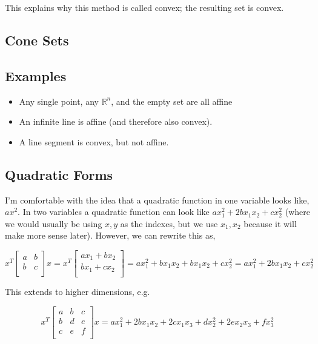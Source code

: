 \documentclass{article}
\begin{document}
This explains why this method is called convex; the resulting set is convex.

\subsection{Cone Sets}

\subsection{Examples}

\begin{itemize}
    \item Any single point, any $\mathbb{R}^n$, and the empty set are all affine
    \item An infinite line is affine (and therefore also convex).
    \item A line segment is convex, but not affine.
\end{itemize}

\subsection{Quadratic Forms}

I'm comfortable with the idea that a quadratic function in one variable looks like, $a x^2$.
In two variables a quadratic function can look like $a x_1^2 + 2 b x_1 x_2 + c x_2^2$ (where we would usually be using $x, y$ as the indexes, but we use $x_1, x_2$ because it will make more sense later).
However, we can rewrite this as,

\begin{equation}
    x^T \begin{bmatrix}
        a & b \\
        b & c \\
    \end{bmatrix} x = x^T  \begin{bmatrix}
        ax_1 + bx_2 \\
        bx_1 + cx_2 \\
    \end{bmatrix}  = ax_1^2 + bx_1x_2 + bx_1x_2 + cx_2^2 = ax_1^2 + 2bx_1x_2 + cx_2^2
\end{equation}

\noindent
This extends to higher dimensions, e.g.

\begin{equation}
    x^T \begin{bmatrix}
        a & b & c \\
        b & d & e \\
        c & e & f \\
    \end{bmatrix} x = a x_1^2 + 2 b x_1 x_2 + 2 c x_1 x_3 + d x_2^2 + 2 e x_2 x_3 + f x_3^2
\end{equation}
\end{document}
